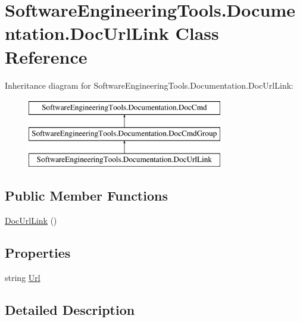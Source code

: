 \hypertarget{class_software_engineering_tools_1_1_documentation_1_1_doc_url_link}{\section{Software\+Engineering\+Tools.\+Documentation.\+Doc\+Url\+Link Class Reference}
\label{class_software_engineering_tools_1_1_documentation_1_1_doc_url_link}
}
Inheritance diagram for Software\+Engineering\+Tools.\+Documentation.\+Doc\+Url\+Link\+:\begin{figure}[H]
\begin{center}
\leavevmode
\includegraphics[height=3.000000cm]{class_software_engineering_tools_1_1_documentation_1_1_doc_url_link}
\end{center}
\end{figure}
\subsection*{Public Member Functions}
\begin{DoxyCompactItemize}
\item 
\hyperlink{class_software_engineering_tools_1_1_documentation_1_1_doc_url_link_a28a7129f175e82999366c320e98dd8e8}{Doc\+Url\+Link} ()
\end{DoxyCompactItemize}
\subsection*{Properties}
\begin{DoxyCompactItemize}
\item 
string \hyperlink{class_software_engineering_tools_1_1_documentation_1_1_doc_url_link_afe05da6ab54502a4183b0150d349f2f4}{Url}
\end{DoxyCompactItemize}


\subsection{Detailed Description}


